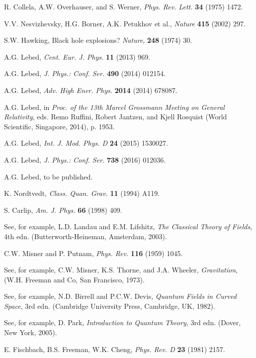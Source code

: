 \documentclass{ws-ijmpd}
\begin{document}
\begin{thebibliography}{0}    %

 R. Collela, A.W. Overhauser, and S. Werner, {\it Phys.
Rev. Lett.} {\bf 34} (1975) 1472.

 V.V. Nesvizhevsky, H.G. Borner, A.K. Petukhov et
al., {\it Nature} {\bf 415} (2002) 297.

S.W. Hawking, Black hole explosions? {\em Nature}, {\bf 248}
(1974) 30.


 A.G. Lebed, {\it Cent. Eur. J. Phys.} {\bf 11} (2013)
969.

 A.G. Lebed, {\it J. Phys.: Conf. Ser.} {\bf 490} (2014)
012154.

 A.G. Lebed, {\it Adv. High Ener. Phys.} {\bf 2014}
(2014) 678087.

 A.G. Lebed, in
{\it Proc. of the 13th Marcel Grossmann Meeting on General Relativity},
eds. Remo Ruffini, Robert Jantzen, and Kjell Rosquist (World Scientific,
Singapore, 2014), p. 1953.

A.G. Lebed, {\it Int. J. Mod. Phys. D} {\bf 24} (2015) 1530027.

A.G. Lebed, {\it J. Phys.: Conf. Ser.} {\bf 738} (2016) 012036.

A.G. Lebed, to be published.

 K. Nordtvedt, {\it Class. Quan. Grav.} {\bf 11}
(1994) A119.


 S. Carlip, {\it Am. J. Phys.} {\bf 66}
(1998) 409.


 See, for example, L.D. Landau and E.M. Lifshitz,
{\it The Classical Theory of Fields}, 4th edn. (Butterworth-Heineman, Amsterdam, 2003).

 C.W. Misner and P. Putnam, {\it Phys. Rev.} {\bf 116}
(1959) 1045.


 See, for example, C.W. Misner, K.S. Thorne, and J.A.
Wheeler, {\it Gravitation}, (W.H. Freeman and Co, San Francisco, 1973).

See, for example, N.D. Birrell and P.C.W. Devis, {\it Quantum
Fields in Curved Space}, 3rd edn. (Cambridge University Press,
Cambridge, UK, 1982).

See, for example, D. Park, {\it Introduction to Quantum Theory},
3rd edn. (Dover, New York, 2005).


 E. Fischbach, B.S. Freeman, W.K. Cheng,
{\it Phys. Rev. D} {\bf 23}
(1981) 2157.





\end{thebibliography}
\end{document}
